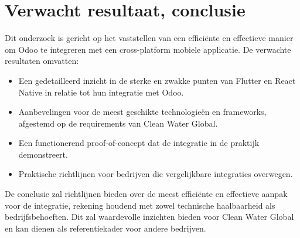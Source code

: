\section{Verwacht resultaat, conclusie}%
\label{sec:verwachte_resultaten}

Dit onderzoek is gericht op het vaststellen van een efficiënte en effectieve manier om Odoo te integreren met een cross-platform mobiele applicatie. De verwachte resultaten omvatten:

\begin{itemize}
    \item Een gedetailleerd inzicht in de sterke en zwakke punten van Flutter en React Native in relatie tot hun integratie met Odoo.
    \item Aanbevelingen voor de meest geschikte technologieën en frameworks, afgestemd op de requirements van Clean Water Global.
    \item Een functionerend proof-of-concept dat de integratie in de praktijk demonstreert.
    \item Praktische richtlijnen voor bedrijven die vergelijkbare integraties overwegen.
\end{itemize}

De conclusie zal richtlijnen bieden over de meest efficiënte en effectieve aanpak voor de integratie, rekening houdend met zowel technische haalbaarheid als bedrijfsbehoeften. Dit zal waardevolle inzichten bieden voor Clean Water Global en kan dienen als referentiekader voor andere bedrijven.
